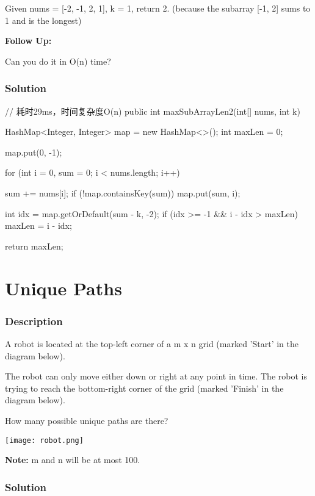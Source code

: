 Given nums = [-2, -1, 2, 1], k = 1,
return 2. (because the subarray [-1, 2] sums to 1 and is the longest)

\textbf{Follow Up:}

Can you do it in O(n) time?
\subsubsection{Solution}

\begin{Code}
// 耗时29ms，时间复杂度O(n)
public int maxSubArrayLen2(int[] nums, int k) {
    HashMap<Integer, Integer> map = new HashMap<>();
    int maxLen = 0;

    map.put(0, -1);

    for (int i = 0, sum = 0; i < nums.length; i++) {
        sum += nums[i];
        if (!map.containsKey(sum)) {
            map.put(sum, i);
        }

        int idx = map.getOrDefault(sum - k, -2);
        if (idx >= -1 && i - idx > maxLen) {
            maxLen = i - idx;
        }
    }

    return maxLen;
}
\end{Code}

\newpage

\section{Unique Paths} %

\subsubsection{Description}
A robot is located at the top-left corner of a m x n grid (marked 'Start' in the diagram below).

The robot can only move either down or right at any point in time. The robot is trying to reach the bottom-right corner of the grid (marked 'Finish' in the diagram below).

How many possible unique paths are there?

\begin{center}
\texttt{[image: robot.png]}\\
\end{center}

\textbf{Note:} m and n will be at most 100.

\subsubsection{Solution}

